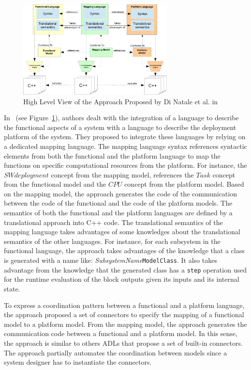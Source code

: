 \begin{figure}[ht!]
	\begin{center}
		\includegraphics[width=0.7\textwidth]{background/figs/diNatale}
		\caption{High Level View of the Approach Proposed by Di Natale et al. in~\cite{dinatale}}
		\label{fig:diNatale}
	\end{center}
\end{figure}

In~\cite{dinatale} (see Figure~\ref{fig:diNatale}), authors dealt with the integration of a language to describe the functional aspects of a system with a language to describe the deployment platform of the system. They proposed to integrate these languages by relying on a dedicated mapping language. The mapping language syntax references syntactic elements from both the functional and the platform language to map the functions on specific computational resources from the platform. For instance, the $SWdeployment$ concept from the mapping model, references the $Task$ concept from the functional model and the $CPU$ concept from the platform model. Based on the mapping model, the approach generates the code of the communication between the code of the functional and the code of the platform models. The semantics of both the functional and the platform languages are defined by a translational approach into C++ code. The translational semantics of the mapping language takes advantages of some knowledges about the translational semantics of the other languages. For instance, for each subsystem in the functional language, the approach takes advantages of the knowledge that a class is generated with a name like: \emph{SubsystemName}\texttt{ModelClass}. It also takes advantage from the knowledge that the generated class has a \texttt{step} operation used for the runtime evaluation of the block outputs given its inputs and its internal state. 

To express a coordination pattern between a functional and a platform language, the approach proposed a set of connectors to specify the mapping of a functional model to a platform model. From the mapping model, the approach generates the communication code between a functional and a platform model. In this sense, the approach is similar to others ADLs that propose a set of built-in connectors. The approach partially automates the coordination between models since a system designer has to instantiate the connectors.  

